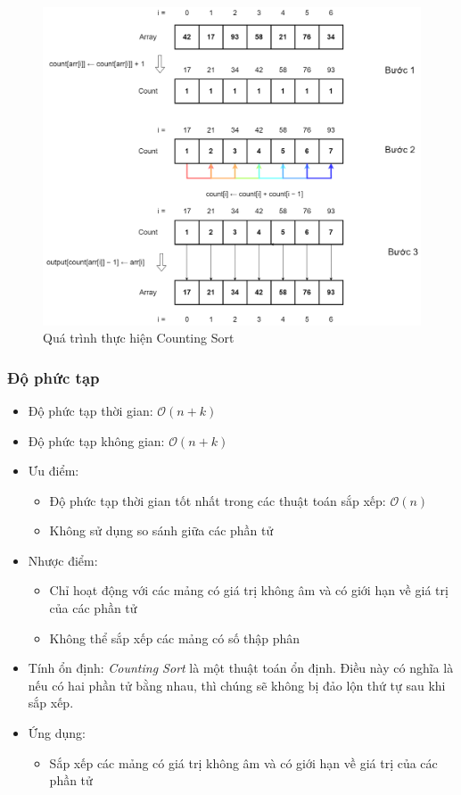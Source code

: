 \begin{figure}[H]
    \centering
    \includegraphics[width=0.75\linewidth]{img/counting_sort/1.png}
    \caption{Quá trình thực hiện Counting Sort}
\end{figure}

\subsubsection{Độ phức tạp}

\begin{itemize}
    \item Độ phức tạp thời gian: $\mathcal{O}(n + k)$
    \item Độ phức tạp không gian: $\mathcal{O}(n + k)$
    \item Ưu điểm:
        \begin{itemize}
            \item Độ phức tạp thời gian tốt nhất trong các thuật toán sắp xếp: $\mathcal{O}(n)$
            \item Không sử dụng so sánh giữa các phần tử
        \end{itemize}
    \item Nhược điểm:
        \begin{itemize}
            \item Chỉ hoạt động với các mảng có giá trị không âm và có giới hạn về giá trị của các phần tử
            \item Không thể sắp xếp các mảng có số thập phân
        \end{itemize}
    \item Tính ổn định: \textit{Counting Sort} là một thuật toán ổn định. Điều này có nghĩa là nếu có hai phần tử bằng nhau, thì chúng sẽ không bị đảo lộn thứ tự sau khi sắp xếp.
    \item Ứng dụng:
        \begin{itemize}
            \item Sắp xếp các mảng có giá trị không âm và có giới hạn về giá trị của các phần tử
        \end{itemize}
\end{itemize}
